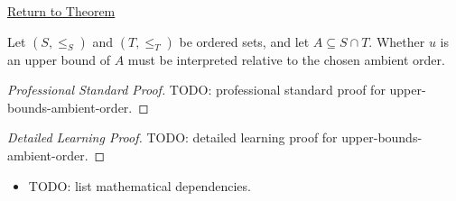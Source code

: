 \newpage
{}
\label{prf:upper-bounds-ambient-order}

\begin{remark*}[Return]
\hyperref[prop:upper-bounds-ambient-order]{Return to Theorem}
\end{remark*}

\begin{theorem*}
Let $(S,\le_S)$ and $(T,\le_T)$ be ordered sets, and let $A\subseteq S\cap T$. Whether $u$ is an upper bound of $A$ must be interpreted relative to the chosen ambient order.
\end{theorem*}

\begin{proof}[Professional Standard Proof]
\LRAProofBodyStart
TODO: professional standard proof for upper-bounds-ambient-order.
\end{proof}

\begin{proof}[Detailed Learning Proof]
\LRAProofBodyStart
TODO: detailed learning proof for upper-bounds-ambient-order.
\end{proof}

\begin{remark*}
\end{remark*}

\begin{dependencies}
\begin{itemize}
  \item TODO: list mathematical dependencies.
\end{itemize}
\end{dependencies}

\clearpage
